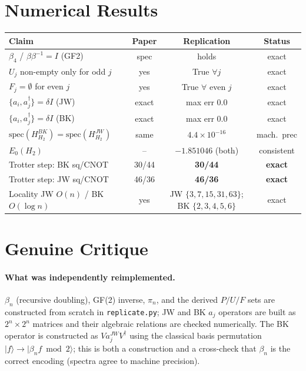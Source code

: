 \documentclass[11pt]{article}
\begin{document}
\section{Numerical Results}
\begin{center}
\begin{tabular}{lccc}
\toprule
Claim & Paper & Replication & Status \\
\midrule
$\beta_4$ / $\beta\beta^{-1}=I$ (GF2)          & spec        & holds                    & exact \\
$U_j$ non-empty only for odd $j$               & yes         & True $\forall j$         & exact \\
$F_j=\emptyset$ for even $j$                   & yes         & True $\forall$ even $j$  & exact \\
$\{a_i,a_j^\dagger\}=\delta I$ (JW)            & exact       & max err $0.0$            & exact \\
$\{a_i,a_j^\dagger\}=\delta I$ (BK)            & exact       & max err $0.0$            & exact \\
$\text{spec}(H^{BK}_{H_2})=\text{spec}(H^{JW}_{H_2})$ & same & $4.4\times10^{-16}$      & mach.\ prec \\
$E_0(H_2)$                                     & --          & $-1.851046$ (both)       & consistent \\
Trotter step: BK sq/CNOT                       & 30/44       & \textbf{30/44}           & \textbf{exact} \\
Trotter step: JW sq/CNOT                       & 46/36       & \textbf{46/36}           & \textbf{exact} \\
Locality JW $O(n)$ / BK $O(\log n)$            & yes         & JW $\{3,7,15,31,63\}$; BK $\{2,3,4,5,6\}$ & exact \\
\bottomrule
\end{tabular}
\end{center}

\section{Genuine Critique}
\paragraph{What was independently reimplemented.} $\beta_n$ (recursive doubling), GF(2)
inverse, $\pi_n$, and the derived $P/U/F$ sets are constructed from scratch in
\texttt{replicate.py}; JW and BK $a_j$ operators are built as $2^n\!\times\!2^n$
matrices and their algebraic relations are checked numerically. The BK operator is
constructed as $V a_j^{JW} V^\dagger$ using the classical basis permutation
$|f\rangle\!\to\!|\beta_n f\!\bmod 2\rangle$; this is both a construction and a
cross-check that $\beta_n$ is the correct encoding (spectra agree to machine precision).
\end{document}
